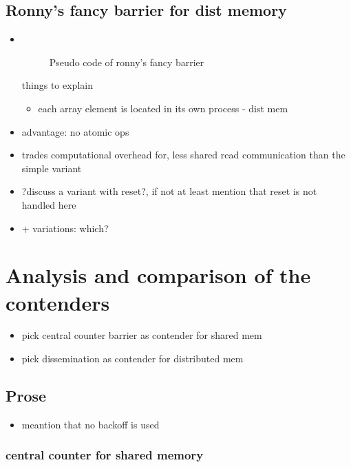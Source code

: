 \documentclass[a4paper, 10pt]{article}
\begin{document}
\subsection{Ronny's fancy barrier for dist memory}
\begin{itemize}
	\item ~
		\begin{figure}[htbp]
			\centering
			
			\caption{Pseudo code of ronny's fancy barrier}
			\label{listing:ronny-fancy-no-reset}
		\end{figure}

		things to explain
		\begin{itemize}
			\item each array element is located in its own process - dist mem
		\end{itemize}

	\item advantage: no atomic ops
	\item trades computational overhead for, less shared read communication than the simple variant
	\item ?discuss a variant with reset?, if not at least mention that reset is not handled here
	\item + variations: which?
\end{itemize}

\section{Analysis and comparison of the contenders}

\begin{itemize}
	\item pick central counter barrier as contender for shared mem
	\item pick dissemination as contender for distributed mem
\end{itemize}

\subsection{Prose}
\begin{itemize}
	\item meantion that no backoff is used
\end{itemize}

\subsubsection{central counter for shared memory}
\end{document}
